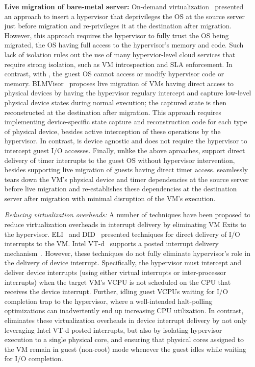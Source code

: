 {\bf Live migration of bare-metal server:} 
On-demand virtualization~\cite{ondemand} presented an approach
to insert a hypervisor that deprivileges the OS at the 
source server just before migration and re-privileges it
at the destination after migration. However, this approach 
requires the hypervisor to fully trust the OS being migrated, 
the OS having full access to the hypervisor's memory and code.
Such lack of isolation rules out the use of many hypervior-level
cloud services that require strong isolation, such as VM introspection
and SLA enforcement. In contrast, with \na, the guest OS 
cannot access or modify hypervisor code or memory.
BLMVisor~\cite{blmvisor,blmvisor-journal} proposes live migration of VMs 
having direct access to physical devices by having the hypervisor
regulary intercept and capture low-level physical device states
during normal execution; the captured state is then reconstructed
at the destination after migration. This approach requires
implementing device-specific state capture and reconstruction code 
for each type of physical device, besides active 
interception of these operations by the hypervisor. 
In contrast, \na is device agnostic and does not require
the hypervisor to intercept guest I/O accesses.
Finally, unlike the above aproaches,
\na support direct delivery of timer interrupts 
to the guest OS without hypervisor intervention, besides supporting
live migration of guests having direct timer access.
\na seamlessly tears down the VM's
physical device and timer dependencies  at the source server before live migration and 
re-establishes these dependencies at the destination server after migration
with minimal disruption of the VM's execution.


{\em Reducing virtualization overheads:}
A number of techniques have been proposed to reduce virtualization
overheads in interrupt delivery by eliminating VM Exits to the hypervisor.
ELI~\cite{amit:2015} and DID~\cite{tu:2015} presented techniques
for direct delivery of I/O interrupts to the VM. 
Intel VT-d~\cite{intelvtd-paper,intelvtd-manual} supports a posted interrupt delivery mechanism~\cite{postedinterrupt}.
However, these techniques do not fully eliminate hypervisor's role
in the delivery of device interrupt.
Specifically, the hypervisor must intercept and deliver device interrupts
(using either virtual interrupts or inter-processor interrupts)
when the target VM's VCPU is not scheduled on the CPU
that receives the device interrupt. Further, idling guest VCPUs
waiting for I/O completion trap to the hypervisor, where a well-intended
halt-polling optimizations can inadvertently end up increasing CPU utilization.
In contrast, \na eliminates these virtualization
overheads in device interrupt delivery by not only leveraging
Intel VT-d posted interrupts, but also by isolating  hypervisor execution 
to a single physical core, and ensuring that physical 
cores assigned to the VM remain in guest (non-root) 
mode whenever the guest idles while waiting for I/O completion.

